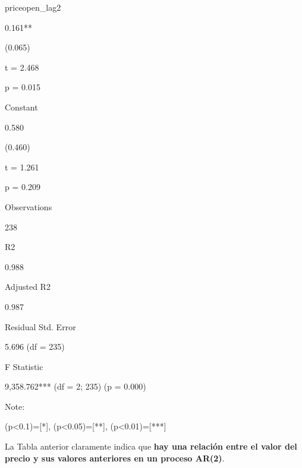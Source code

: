 \documentclass[
]{book}
\begin{document}
priceopen\_lag2

0.161**

(0.065)

t = 2.468

p = 0.015

Constant

0.580

(0.460)

t = 1.261

p = 0.209

Observations

238

R2

0.988

Adjusted R2

0.987

Residual Std. Error

5.696 (df = 235)

F Statistic

9,358.762*** (df = 2; 235) (p = 0.000)

Note:

(p\textless0.1)={[}*{]}, (p\textless0.05)={[}**{]}, (p\textless0.01)={[}***{]}

La Tabla anterior claramente indica que \textbf{hay una
relación entre el valor del precio y sus valores anteriores en un
proceso AR(2)}.

  
\end{document}
